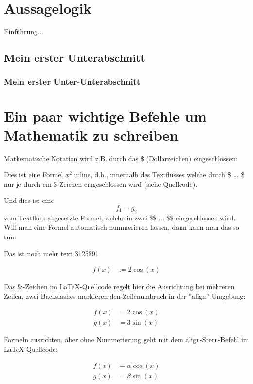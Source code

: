 \newpage

\section{Aussagelogik}

Einführung...

\subsection{Mein erster Unterabschnitt}

\subsubsection{Mein erster Unter-Unterabschnitt}


\section{Ein paar wichtige Befehle um Mathematik zu schreiben}

Mathematische Notation wird z.B. durch das \$ (Dollarzeichen) eingeschlossen: 

Dies ist eine Formel $x^2$ inline, d.h., innerhalb des Textflusses welche durch \$ ... \$ nur je durch ein \$-Zeichen eingeschlossen wird (siehe Quellcode).

Und dies ist eine $$f_1 = g_2$$ vom Textfluss abgesetzte Formel, welche in zwei \$\$ ... \$\$ eingeschlossen wird. Will man eine Formel automatisch nummerieren lassen, dann kann man das so tun:

Das ist noch mehr text 3125891

\begin{align}
	f(x) &:= 2 \cos(x) 
\end{align}

Das \&-Zeichen im LaTeX-Quellcode regelt hier die Ausrichtung bei mehreren Zeilen, zwei Backslashes markieren den Zeilenumbruch in der ''align''-Umgebung:

\begin{align}
	f(x) &= 2 \cos(x) \\
	g(x) &= 3 \sin(x)
\end{align}		

Formeln ausrichten, aber ohne Nummerierung geht mit dem align-Stern-Befehl im LaTeX-Quellcode:

\begin{align*}
	f(x) &= \alpha \cos(x) \\
	g(x) &= \beta \sin(x)
\end{align*}		

